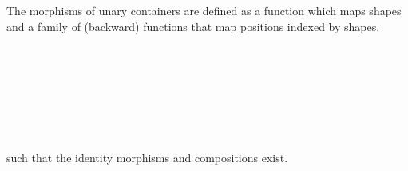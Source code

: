 The morphisms of unary containers are defined as a function which maps shapes and a family of (backward) functions that map positions indexed by shapes.

\begin{code}%
\>[0]\AgdaSpace{}%
\AgdaSpace{}%
\AgdaSymbol{(}\AgdaSpace{}%
\AgdaSpace{}%
\AgdaSymbol{:}\AgdaSpace{}%
\AgdaSymbol{)}\AgdaSpace{}%
\AgdaSymbol{:}\AgdaSpace{}%
\AgdaSpace{}%
\<%
\\
\>[0][@{}l@{\AgdaIndent{0}}]%
\>[2]\AgdaSpace{}%
\<%
\\
%
\>[2]\AgdaSpace{}%
\AgdaSpace{}%
\<%
\\
%
\>[2]\AgdaSpace{}%
\AgdaSpace{}%
\AgdaSpace{}%
\AgdaSpace{}%
\AgdaSymbol{(}\AgdaSpace{}%
\AgdaSpace{}%
\AgdaSymbol{;}\AgdaSpace{}%
\AgdaSpace{}%
\AgdaSpace{}%
\AgdaSymbol{)}\<%
\\
%
\>[2]\<%
\\
\>[2][@{}l@{\AgdaIndent{0}}]%
\>[4]\AgdaSpace{}%
\AgdaSymbol{:}\AgdaSpace{}%
\AgdaSpace{}%
\AgdaSpace{}%
\<%
\\
%
\>[4]\AgdaSpace{}%
\AgdaSymbol{:}\AgdaSpace{}%
\AgdaSymbol{(}\AgdaSpace{}%
\AgdaSymbol{:}\AgdaSpace{}%
\AgdaSymbol{)}\AgdaSpace{}%
\AgdaSpace{}%
\AgdaSpace{}%
\AgdaSymbol{(}\AgdaSpace{}%
\AgdaSymbol{)}\AgdaSpace{}%
\AgdaSpace{}%
\AgdaSpace{}%
\<%
\end{code}

\begin{code}[hide]%
\>[0]\AgdaSpace{}%
\AgdaSpace{}%
\AgdaSpace{}%
\AgdaSymbol{:}\AgdaSpace{}%
\AgdaSpace{}%
\AgdaSpace{}%
\<%
\end{code}

such that the identity morphisms and compositions exist.

